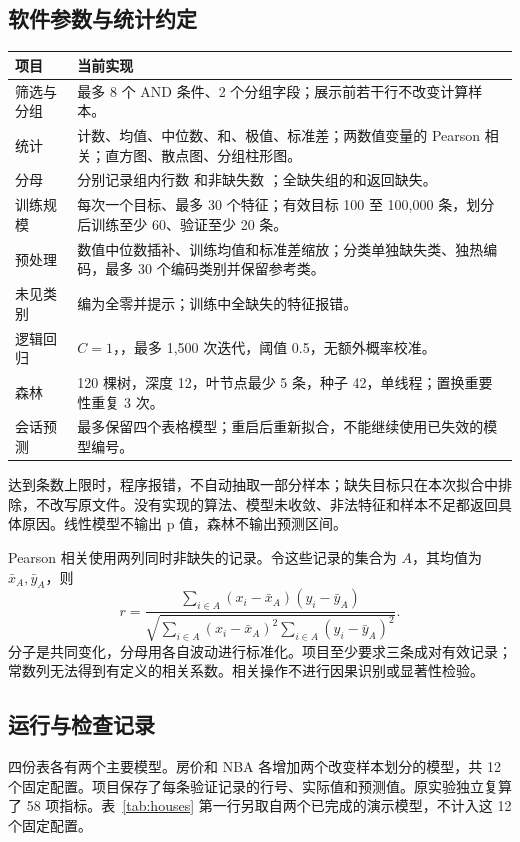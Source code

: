 \subsection{软件参数与统计约定}
\begin{center}\small
\begin{tabularx}{\textwidth}{lY}
\toprule
项目 & 当前实现\\
\midrule
筛选与分组 & 最多 8 个 AND 条件、2 个分组字段；展示前若干行不改变计算样本。\\
统计 & 计数、均值、中位数、和、极值、标准差；两数值变量的 Pearson 相关；直方图、散点图、分组柱形图。\\
分母 & 分别记录组内行数  和非缺失数 ；全缺失组的和返回缺失。\\
训练规模 & 每次一个目标、最多 30 个特征；有效目标 100 至 100,000 条，划分后训练至少 60、验证至少 20 条。\\
预处理 & 数值中位数插补、训练均值和标准差缩放；分类单独缺失类、独热编码，最多 30 个编码类别并保留参考类。\\
未见类别 & 编为全零并提示；训练中全缺失的特征报错。\\
逻辑回归 & $C=1$，，最多 1,500 次迭代，阈值 0.5，无额外概率校准。\\
森林 & 120 棵树，深度 12，叶节点最少 5 条，种子 42，单线程；置换重要性重复 3 次。\\
会话预测 & 最多保留四个表格模型；重启后重新拟合，不能继续使用已失效的模型编号。\\
\bottomrule
\end{tabularx}
\end{center}
达到条数上限时，程序报错，不自动抽取一部分样本；缺失目标只在本次拟合中排除，不改写原文件。没有实现的算法、模型未收敛、非法特征和样本不足都返回具体原因。线性模型不输出 p 值，森林不输出预测区间。

Pearson 相关使用两列同时非缺失的记录。令这些记录的集合为 $A$，其均值为 $\bar x_A,\bar y_A$，则
\[
r=\frac{\sum_{i\in A}(x_i-\bar x_A)(y_i-\bar y_A)}
{\sqrt{\sum_{i\in A}(x_i-\bar x_A)^2\sum_{i\in A}(y_i-\bar y_A)^2}}.
\]
分子是共同变化，分母用各自波动进行标准化。项目至少要求三条成对有效记录；常数列无法得到有定义的相关系数。相关操作不进行因果识别或显著性检验。

\subsection{运行与检查记录}
四份表各有两个主要模型。房价和 NBA 各增加两个改变样本划分的模型，共 12 个固定配置。项目保存了每条验证记录的行号、实际值和预测值。原实验独立复算了 58 项指标。表~\ref{tab:houses} 第一行另取自两个已完成的演示模型，不计入这 12 个固定配置。

